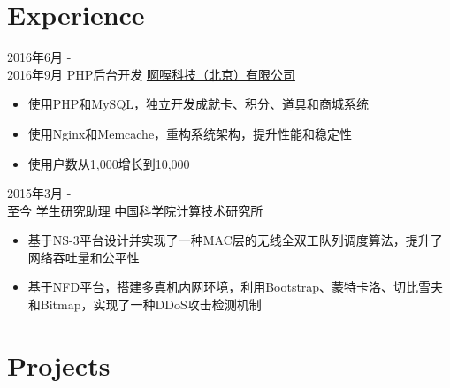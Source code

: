 \documentclass[letterpaper]{twentysecondcv} %
\begin{document}
\makeprofile %



\section{Experience}

\begin{twenty} %
	\twentyitem
    	{2016年6月 - \\2016年9月}
        {PHP后台开发}
        {\href{http://www.runorout.cn/}{啊喔科技（北京）有限公司}}
        {}
        {
        {\begin{itemize}
        \item 使用PHP和MySQL，独立开发成就卡、积分、道具和商城系统
        \item 使用Nginx和Memcache，重构系统架构，提升性能和稳定性
        \item 使用户数从1,000增长到10,000
    \end{itemize}}
        }
    
    \twentyitem
	    {2015年3月 - \\至今}
	    {学生研究助理}
	    {\href{http://english.ict.cas.cn/}{中国科学院计算技术研究所}}
	    {}
	    {
    	{\begin{itemize}
    			\item 基于NS-3平台设计并实现了一种MAC层的无线全双工队列调度算法，提升了网络吞吐量和公平性
    			\item 基于NFD平台，搭建多真机内网环境，利用Bootstrap、蒙特卡洛、切比雪夫和Bitmap，实现了一种DDoS攻击检测机制
    	\end{itemize}}
    }
        
\end{twenty}


\section{Projects}
\end{document}
